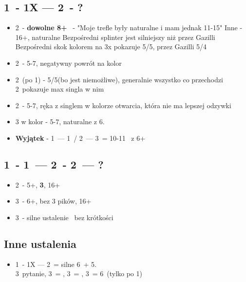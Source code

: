 \documentclass[12pt, a4paper]{article}
\begin{document}
\subsection{1\major\ - 1X --- 2\clubs\ - ?}
\begin{itemize} 
    \item 2\diams\ - \textbf{dowolne 8+}
    \major\ - "Moje trefle były naturalne i mam jednak 11-15"
    \subitem Inne - 16+, naturalne
    \subitem Bezpośredni splinter jest silniejszy niż przez Gazilli
    \subitem Bezpośredni skok kolorem na 3x pokazuje 5/5, przez Gazilli 5/4
    \item 2\major\ - 5-7, negatywny powrót na kolor
    \item 2\spades\ (po 1\hearts) - 5/5\minor (bo jest niemożliwe), 
    generalnie wszystko co przechodzi 2\major\ pokazuje max singla w nim
    \item 2\nt\ - 5-7, ręka z singlem w kolorze otwarcia, która nie ma lepszej odzywki
    \item 3 w kolor - 5-7, naturalne z 6.
    \item \textbf{Wyjątek} - 1\hearts\ --- 1\spades\ / 2\clubs\ --- 3\spades\ = 10-11 \inv\ z 6+\spades
\end{itemize}

\subsection{1\hearts\ - 1\spades\ --- 2\clubs\ - 2\diams\ --- ?}
\begin{itemize}
    \item 2\spades\ - 5+\hearts, \textbf{3\spades}, 16+
    \item 3\hearts\ - 6+\hearts, bez 3 pików, 16+
    \item 3\spades\ - silne ustalenie \spades\ bez krótkości
\end{itemize}

\subsection{Inne ustalenia}
\begin{itemize}
    \item 1\major\ - 1X --- 2\nt\ = silne 6\major\ + 5\minor. \\ 3\clubs\ pytanie, 
    3\diams\ = \clubs, 3\hearts\ = \diams, 3\spades\ = 6\hearts\ (tylko po 1\spades)
\end{itemize}
\end{document}
